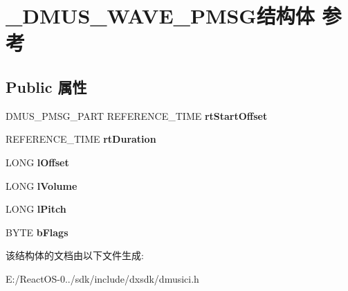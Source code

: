 \hypertarget{struct___d_m_u_s___w_a_v_e___p_m_s_g}{}\section{\+\_\+\+D\+M\+U\+S\+\_\+\+W\+A\+V\+E\+\_\+\+P\+M\+S\+G结构体 参考}
\label{struct___d_m_u_s___w_a_v_e___p_m_s_g}
\subsection*{Public 属性}
\begin{DoxyCompactItemize}
\item 
\mbox{\label{struct___d_m_u_s___w_a_v_e___p_m_s_g_aacf9094ef2b574fe9691684157546942}} 
D\+M\+U\+S\+\_\+\+P\+M\+S\+G\+\_\+\+P\+A\+RT R\+E\+F\+E\+R\+E\+N\+C\+E\+\_\+\+T\+I\+ME {\bfseries rt\+Start\+Offset}
\item 
\mbox{\label{struct___d_m_u_s___w_a_v_e___p_m_s_g_a663c04438907ba16f40b484d9188e867}} 
R\+E\+F\+E\+R\+E\+N\+C\+E\+\_\+\+T\+I\+ME {\bfseries rt\+Duration}
\item 
\mbox{\label{struct___d_m_u_s___w_a_v_e___p_m_s_g_aceac5e20d38327400e0920e79aac775b}} 
L\+O\+NG {\bfseries l\+Offset}
\item 
\mbox{\label{struct___d_m_u_s___w_a_v_e___p_m_s_g_ac497876c4615957651683ab5b37c6535}} 
L\+O\+NG {\bfseries l\+Volume}
\item 
\mbox{\label{struct___d_m_u_s___w_a_v_e___p_m_s_g_a7713c1ecbca1551a12ba5997605458d9}} 
L\+O\+NG {\bfseries l\+Pitch}
\item 
\mbox{\label{struct___d_m_u_s___w_a_v_e___p_m_s_g_ace5870fa7a780917d6b18b8b9731fd20}} 
B\+Y\+TE {\bfseries b\+Flags}
\end{DoxyCompactItemize}


该结构体的文档由以下文件生成\+:\begin{DoxyCompactItemize}
\item 
E\+:/\+React\+O\+S-\/0../sdk/include/dxsdk/dmusici.\+h\end{DoxyCompactItemize}
